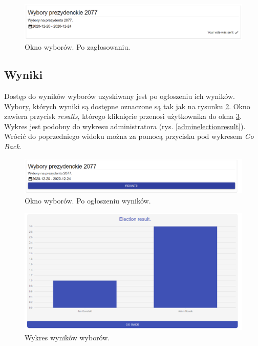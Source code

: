 \documentclass[a4paper,12pt]{book}
\begin{document}
\begin{figure}[H]
	\centering
	\includegraphics[width=\textwidth]{images/votesent.png}
	\caption{Okno wyborów. Po zagłosowaniu.}\label{votesent}
\end {figure}

\subsection{Wyniki}

Dostęp do wyników wyborów uzyskiwany jest po ogłoszeniu ich wyników. Wybory, których wyniki są dostępne oznaczone są tak jak na rysunku \ref{voterresults}. Okno zawiera przycisk \textit{results}, którego kliknięcie przenosi użytkownika do okna \ref{resultdiagram}. Wykres jest podobny do wykresu administratora (rys. \ref{adminelectionresult}). Wrócić do poprzedniego widoku można za pomocą przycisku pod wykresem \textit{Go Back}.

\begin{figure}[H]
	\centering
	\includegraphics[width=\textwidth]{images/voterresults.png}
	\caption{Okno wyborów. Po ogłoszeniu wyników.}\label{voterresults}
\end {figure}

\begin{figure}[H]
	\centering
	\includegraphics[width=\textwidth]{images/resultdiagram.png}
	\caption{Wykres wyników wyborów.}\label{resultdiagram}
\end {figure}
\end{document}
